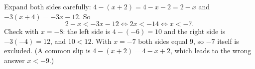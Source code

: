 Expand both sides carefully: $4-(x+2)=4-x-2=2-x$ and $-3(x+4)=-3x-12$. So
\[
2-x<-3x-12\iff 2x<-14\iff \boxed{x<-7}.
\]
Check with $x=-8$: the left side is $4-(-6)=10$ and the right side is $-3(-4)=12$, and $10<12$. With $x=-7$ both sides equal $9$, so $-7$ itself is excluded. (A common slip is $4-(x+2)=4-x+2$, which leads to the wrong answer $x<-9$.)
